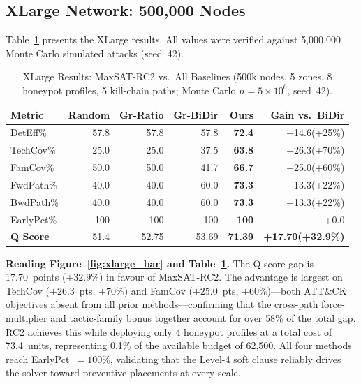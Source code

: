 \documentclass[journal]{IEEEtran}
\begin{document}
\subsection{XLarge Network: 500,000 Nodes}

Table~\ref{tab:xlarge} presents the XLarge results.
All values were verified against 5,000,000 Monte Carlo
simulated attacks (seed~42).

\begin{table}[htbp]
\caption{XLarge Results: MaxSAT-RC2 vs.\ All Baselines
         (500k nodes, 5 zones, 8 honeypot profiles,
         5 kill-chain paths; Monte Carlo $n=5\times10^6$,
         seed~42).}
\label{tab:xlarge}
\centering\renewcommand{\arraystretch}{1.2}
\begin{tabular}{@{}lrrrrr@{}}
\toprule
\textbf{Metric}&\textbf{Random}&\textbf{Gr-Ratio}&
\textbf{Gr-BiDir}&\textbf{Ours}&\textbf{Gain vs.\ BiDir}\\
\midrule
DetEff\%   &57.8&57.8&57.8&\textbf{72.4}&+14.6(+25\%)\\
TechCov\%  &25.0&25.0&37.5&\textbf{63.8}&+26.3(+70\%)\\
FamCov\%   &50.0&50.0&41.7&\textbf{66.7}&+25.0(+60\%)\\
FwdPath\%  &40.0&40.0&60.0&\textbf{73.3}&+13.3(+22\%)\\
BwdPath\%  &40.0&40.0&60.0&\textbf{73.3}&+13.3(+22\%)\\
EarlyPct\% &100 &100 &100 &\textbf{100} &+0.0\\
\midrule
\textbf{Q Score}&51.4&52.75&53.69&\textbf{71.39}&
  \textbf{+17.70(+32.9\%)}\\
\bottomrule
\end{tabular}
\end{table}

\begin{insightbox}
\textbf{Reading Figure~\ref{fig:xlarge_bar} and
Table~\ref{tab:xlarge}.}
The Q-score gap is 17.70~points ($+32.9\%$) in favour of
MaxSAT-RC2.
The advantage is largest on TechCov ($+26.3$~pts, $+70\%$)
and FamCov ($+25.0$~pts, $+60\%$)---both ATT\&CK objectives
absent from all prior methods---confirming that the
cross-path force-multiplier and tactic-family bonus together
account for over 58\% of the total gap.
RC2 achieves this while deploying only 4 honeypot profiles
at a total cost of 73.4~units, representing 0.1\% of the
available budget of 62,500.
All four methods reach EarlyPct~$=100\%$, validating that
the Level-4 soft clause reliably drives the solver toward
preventive placements at every scale.
\end{insightbox}
\end{document}
